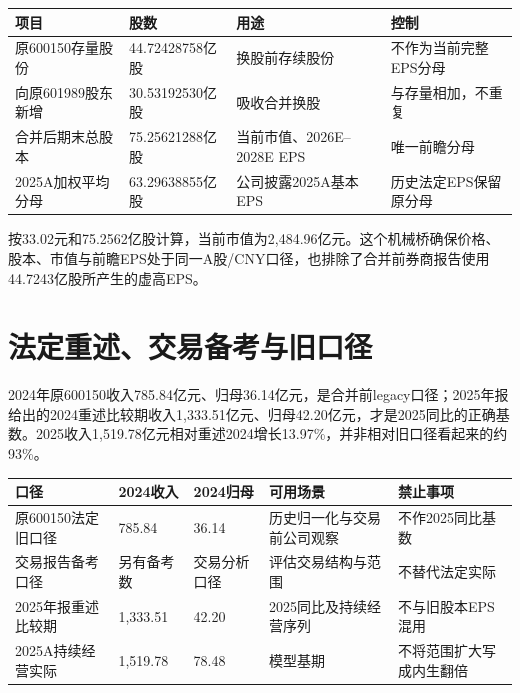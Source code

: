 \begin{exhibitbox}[股本与每股口径桥]
\small
\begin{tabularx}{\exhibitboxwidth}{L{4.1cm}R{3.0cm}L{4.4cm}X}
\toprule
\textbf{项目} & \textbf{股数} & \textbf{用途} & \textbf{控制} \\
\midrule
原600150存量股份 & 44.72428758亿股 & 换股前存续股份 & 不作为当前完整EPS分母 \\
向原601989股东新增 & 30.53192530亿股 & 吸收合并换股 & 与存量相加，不重复 \\
合并后期末总股本 & 75.25621288亿股 & 当前市值、2026E--2028E EPS & 唯一前瞻分母 \\
2025A加权平均分母 & 63.29638855亿股 & 公司披露2025A基本EPS & 历史法定EPS保留原分母 \\
\bottomrule
\end{tabularx}
\end{exhibitbox}

按33.02元和75.2562亿股计算，当前市值为2,484.96亿元。这个机械桥确保价格、股本、市值与前瞻EPS处于同一A股/CNY口径，也排除了合并前券商报告使用44.7243亿股所产生的虚高EPS。

\section{法定重述、交易备考与旧口径}

2024年原600150收入785.84亿元、归母36.14亿元，是合并前legacy口径；2025年报给出的2024重述比较期收入1,333.51亿元、归母42.20亿元，才是2025同比的正确基数。2025收入1,519.78亿元相对重述2024增长13.97\%，并非相对旧口径看起来的约93\%。

\begin{exhibitbox}[三种财务口径不可拼接]
\small
\begin{tabularx}{\exhibitboxwidth}{L{3.1cm}R{2.5cm}R{2.5cm}L{3.6cm}X}
\toprule
\textbf{口径} & \textbf{2024收入} & \textbf{2024归母} & \textbf{可用场景} & \textbf{禁止事项} \\
\midrule
原600150法定旧口径 & 785.84 & 36.14 & 历史归一化与交易前公司观察 & 不作2025同比基数 \\
交易报告备考口径 & 另有备考数 & 交易分析口径 & 评估交易结构与范围 & 不替代法定实际 \\
2025年报重述比较期 & 1,333.51 & 42.20 & 2025同比及持续经营序列 & 不与旧股本EPS混用 \\
2025A持续经营实际 & 1,519.78 & 78.48 & 模型基期 & 不将范围扩大写成内生翻倍 \\
\bottomrule
\end{tabularx}
\end{exhibitbox}

